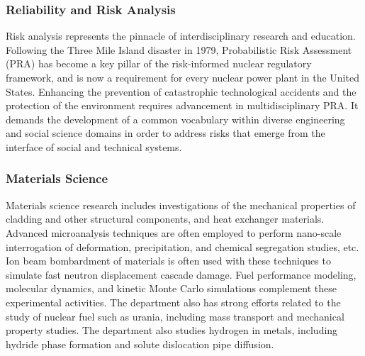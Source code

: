 \subsubsection{Reliability and Risk Analysis}
Risk analysis represents the pinnacle of interdisciplinary research and education. Following the Three Mile Island disaster in 1979, Probabilistic Risk Assessment (PRA) has become a key pillar of the risk-informed nuclear regulatory framework, and is now a requirement for every nuclear power plant in the United States. Enhancing the prevention of catastrophic technological accidents and the protection of the environment requires advancement in multidisciplinary PRA. It demands the development of a common vocabulary within diverse engineering and social science domains in order to address risks that emerge from the interface of social and technical systems.


\subsubsection{Materials Science}
Materials science research includes investigations of the mechanical properties of cladding and other structural components, and heat exchanger materials. Advanced microanalysis techniques are often employed to perform nano-scale interrogation of deformation, precipitation, and chemical segregation studies, etc. Ion beam bombardment of materials is often used with these techniques to simulate fast neutron displacement cascade damage. Fuel performance modeling, molecular dynamics, and kinetic Monte Carlo simulations complement these experimental activities. The department also has strong efforts related to the study of nuclear fuel such as urania, including mass transport and mechanical property studies. The department also studies hydrogen in metals, including hydride phase formation and solute dislocation pipe diffusion.


